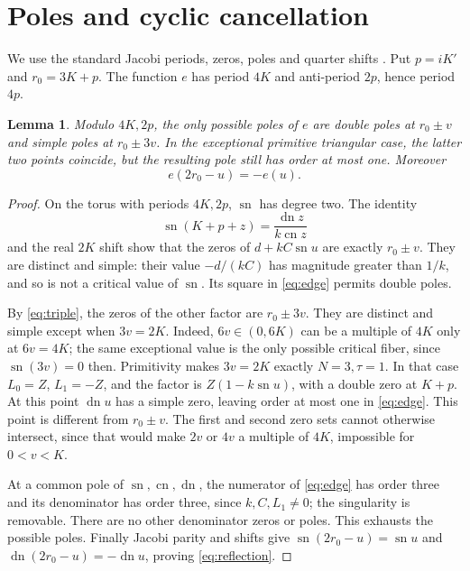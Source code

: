 \documentclass[11pt]{article}
\newtheorem{lemma}{Lemma}
\newcommand{\sn}{\operatorname{sn}}
\newcommand{\cn}{\operatorname{cn}}
\newcommand{\dn}{\operatorname{dn}}
\begin{document}
\section{Poles and cyclic cancellation}
We use the standard Jacobi periods, zeros, poles and quarter shifts \cite[\S\S22.4,22.8]{DLMF}. Put $p=iK'$ and $r_0=3K+p$. The function $e$ has period $4K$ and anti-period $2p$, hence period $4p$.

\begin{lemma}\label{lem:poles}
Modulo $4K,2p$, the only possible poles of $e$ are double poles at $r_0\pm v$ and simple poles at $r_0\pm3v$. In the exceptional primitive triangular case, the latter two points coincide, but the resulting pole still has order at most one. Moreover
\begin{equation}\label{eq:reflection}
 e(2r_0-u)=-e(u).
\end{equation}
\end{lemma}
\begin{proof}
On the torus with periods $4K,2p$, $\sn$ has degree two. The identity
\[
 \sn(K+p+z)=\frac{\dn z}{k\cn z}
\]
and the real $2K$ shift show that the zeros of $d+kC\sn u$ are exactly $r_0\pm v$. They are distinct and simple: their value $-d/(kC)$ has magnitude greater than $1/k$, and so is not a critical value of $\sn$. Its square in \eqref{eq:edge} permits double poles.

By \eqref{eq:triple}, the zeros of the other factor are $r_0\pm3v$. They are distinct and simple except when $3v=2K$. Indeed, $6v\in(0,6K)$ can be a multiple of $4K$ only at $6v=4K$; the same exceptional value is the only possible critical fiber, since $\sn(3v)=0$ then. Primitivity makes $3v=2K$ exactly $N=3,\tau=1$. In that case $L_0=Z$, $L_1=-Z$, and the factor is $Z(1-k\sn u)$, with a double zero at $K+p$. At this point $\dn u$ has a simple zero, leaving order at most one in \eqref{eq:edge}. This point is different from $r_0\pm v$. The first and second zero sets cannot otherwise intersect, since that would make $2v$ or $4v$ a multiple of $4K$, impossible for $0<v<K$.

At a common pole of $\sn,\cn,\dn$, the numerator of \eqref{eq:edge} has order three and its denominator has order three, since $k,C,L_1\ne0$; the singularity is removable. There are no other denominator zeros or poles. This exhausts the possible poles. Finally Jacobi parity and shifts give $\sn(2r_0-u)=\sn u$ and $\dn(2r_0-u)=-\dn u$, proving \eqref{eq:reflection}.
\end{proof}
\end{document}
